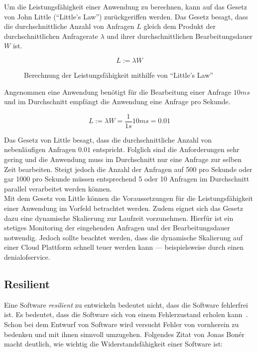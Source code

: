 Um die Leistungsfähigkeit einer Anwendung zu berechnen, kann auf das Gesetz von John Little (\enquote{Little's Law}) zurückgeriffen werden. Das Gesetz besagt, dass die durchschnittliche Anzahl von Anfragen $L$ gleich dem Produkt der durchschnittlichen Anfragerate $\lambda$ und ihrer durchschnittlichen Bearbeitungsdauer $W$ ist.

\begin{figure}[H]
  \[L := \lambda W\]
  \caption{Berechnung der Leistungsfähigkeit mithilfe von \enquote{Little's Law}}
\end{figure}

Angenommen eine Anwendung benötigt für die Bearbeitung einer Anfrage $10ms$ und im Durchschnitt empfängt die Anwendung eine Anfrage pro Sekunde. 

\begin{figure}[H]
  \[L := \lambda W = \frac{1}{1s} 10ms = 0.01\]
\end{figure}

\vspace{-0.5cm}

Das Gesetz von Little besagt, dass die durchschnittliche Anzahl von nebenläufigen Anfragen $0.01$ entspricht. Folglich sind die Anforderungen sehr gering und die Anwendung muss im Durchschnitt nur eine Anfrage zur selben Zeit bearbeiten. Steigt jedoch die Anzahl der Anfragen auf 500 pro Sekunde oder gar 1000 pro Sekunde müssen entsprechend 5 oder 10 Anfragen im Durchschnitt parallel verarbeitet werden können.\\
Mit dem Gesetz von Little können die Voraussetzungen für die Leistungsfähigkeit einer Anwendung im Vorfeld betrachtet werden. Zudem eignet sich das Gesetz dazu eine dynamische Skalierung zur Laufzeit vorzunehmen. Hierfür ist ein stetiges Monitoring der eingehenden Anfragen und der Bearbeitungsdauer notwendig. Jedoch sollte beachtet werden, dass die dynamische Skalierung auf einer Cloud Plattform schnell teuer werden kann --- beispielsweise durch einen \gls{denialofservice}.

\pagebreak

\subsection{Resilient}\label{subsec:resilient}
Eine Software \textit{resilient} zu entwickeln bedeutet nicht, dass die Software fehlerfrei ist. Es bedeutet, dass die Software sich von einem Fehlerzustand erholen kann~\cite[S.~6]{vernon_reactive_2016}.\\
Schon bei dem Entwurf von Software wird versucht Fehler von vornherein zu bedenken und mit ihnen sinnvoll umzugehen. Folgendes Zitat von Jonas Bonér macht deutlich, wie wichtig die Widerstandsfähigkeit einer Software ist:

